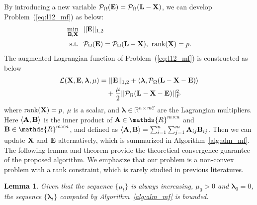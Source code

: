 \documentclass[10pt,twocolumn,letterpaper]{article}
\newtheorem{lemma}{Lemma}
\def\calP{\mathcal{P}}
\def\bB{{\bf B}}
\def\bE{{\bf E}}
\def\blambda{{\bm \lambda}}
\def\calL{{\mathcal{L}}}
\def\calC{{\mathcal{C}}}
\def\bL{{\bf L}}
\def\dsR{\mathds{R}}
\def\bX{{\bf X}}
\def\bA{{\bf A}}
\def\bX{{\bf X}}
\def\st{{\text{s.t.}}}
\def\rank{{\text{rank}}}
\begin{document}
By introducing a new variable $\calP_{\Omega} (\bE) = \calP_{\Omega} (\bL - \bX)$, we can develop Problem~(\ref{eq:l12_mf}) as below:
{
\begin{align}\label{eq:mf_l21_constrained}
  \min_{\bE, \bX} ~&~ || \bE ||_{1,2}      \nonumber \\
  \st             ~&~ \calP_{\Omega} (\bE) = \calP_{\Omega} (\bL - \bX)  ,~ \rank(\bX) = p  .
\end{align}
}
\noindent
The augmented Lagrangian function of Problem~(\ref{eq:l12_mf}) is constructed as below
{
\begin{align}\label{eq:lagrangian_l21}
  \calL (\bX, \bE, \blambda, \mu) = &~ || \bE ||_{1,2} + \langle \blambda, \calP_{\Omega} (\bL - \bX - \bE) \rangle      \nonumber \\
                                    & + \frac{\mu}{2} || \calP_{\Omega} (\bL - \bX - \bE) ||_F^2
\end{align}
}
\noindent
where $\rank (\bX) = p$, $\mu$ is a scalar,
and $\blambda \in \dsR^{n \times m\calC}$ are the Lagrangian multipliers.
Here $\langle \bA, \bB \rangle$ is the inner product of $\bA \in \dsR^{m \times n}$ and $\bB \in \dsR^{m \times n}$, and defined as $\langle \bA, \bB \rangle = \sum_{i=1}^{n} \sum_{j=1}^{m} \bA_{ij} \bB_{ij}$.
Then we can update $\bX$ and $\bE$ alternatively, which is summarized in Algorithm~\ref{alg:alm_mf}.
The following lemma and theorem provide the theoretical convergence guarantee of the proposed algorithm.
We emphasize that our problem is a non-convex problem with a rank constraint, which is rarely studied in previous literatures.


\begin{lemma}
Given that the sequence $\{ \mu_{t} \}$ is always increasing, $\mu_{0} > 0$ and $\blambda_{0} = 0$, the sequence $\{ \blambda_{t} \}$ computed by Algorithm~\ref{alg:alm_mf} is bounded.
\end{lemma}
\end{document}
